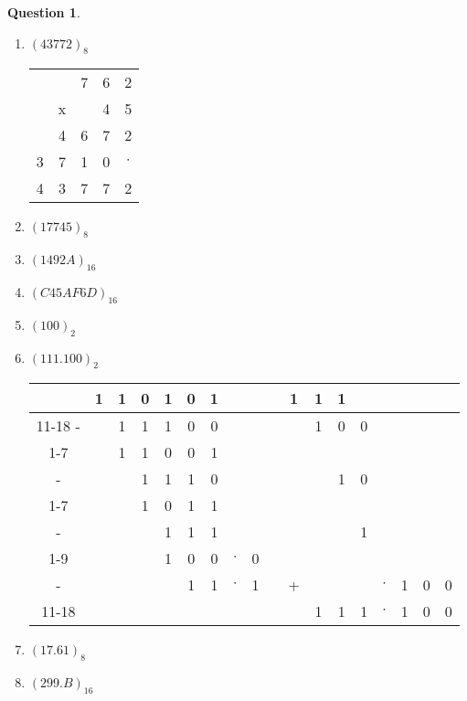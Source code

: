\documentclass[11pt,a4paper]{article}
\theoremstyle{definition}%
\newtheorem{Q}{Question}[] %
\begin{document}
\begin{Q}
{\begin{enumerate}
		\item $(43772)_8$

		\begin{tabular}{ccccc}
		&& 7 & 6 & 2 \\
		& x & & 4 & 5 \\ \hline
		& 4 & 6 & 7 & 2 \\
		3 & 7 & 1 & 0 & $\cdot$ \\ \hline
		4 & 3 & 7 & 7 & 2 \\
		\end{tabular}

		\item $(17745)_8$
		\item $(1492A)_{16}$
		\item $(C45AF6D)_{16}$
		\item $(100)_2$
		\item $(111.100)_2$

		\begin{tabular}{cccccccccccccccccc}
		  & 1 & 1 & 0 & 1 & 0 & 1 &         &   & \multicolumn{1}{c|}{} & 1 & 1 & 1 &         &   &   &   &   \\ \cline{11-18}
		- &   & 1 & 1 & 1 & 0 & 0 &         &   & \multicolumn{1}{c|}{} &   & 1 & 0 & 0 &         &   &   &   \\ \cline{1-7}
		  &   & 1 & 1 & 0 & 0 & 1 &         &   & \multicolumn{1}{c|}{} &   &   &   &   &         &   &   &   \\
		- &   &   & 1 & 1 & 1 & 0 &         &   & \multicolumn{1}{c|}{} &   &   & 1 & 0 &         &   &   &   \\ \cline{1-7}
		  &   &   & 1 & 0 & 1 & 1 &         &   & \multicolumn{1}{c|}{} &   &   &   &   &         &   &   &   \\
		- &   &   &   & 1 & 1 & 1 &         &   & \multicolumn{1}{c|}{} &   &   &   & 1 &         &   &   &   \\\cline{1-9}
		  &   &   &   & 1 & 0 & 0 & $\cdot$ & 0 & \multicolumn{1}{c|}{} &   &   &   &   &         &   &   &   \\
		- &   &   &   &   & 1 & 1 & $\cdot$ & 1 &                       & + &   &   &   & $\cdot$ & 1 & 0 & 0 \\ \cline{11-18}
		  &   &   &   &   &   &   &         &   &                       &   & 1 & 1 & 1 & $\cdot$ & 1 & 0 & 0 \\
		\end{tabular}

		\item $(17.61)_8$
		\item $(299.B)_{16}$
	\end{enumerate}
}
\end{Q}
\end{document}

